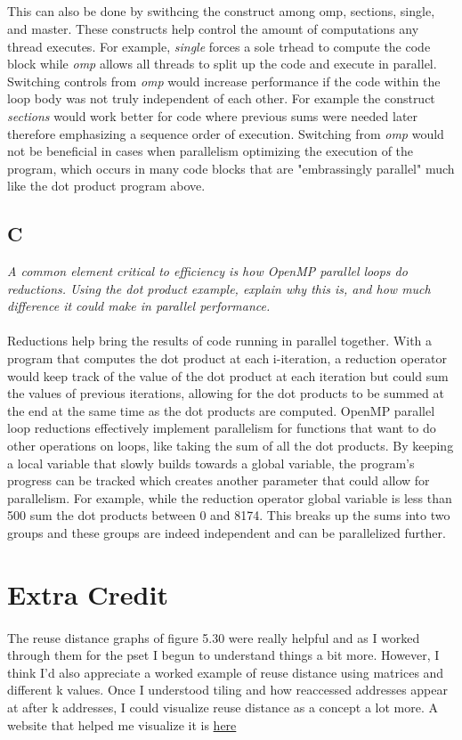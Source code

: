\documentclass[10pt]{article}
\begin{document}
\subparagraph{} This can also be done by swithcing the construct among omp, sections, single, and master. These constructs help control the amount of computations
any thread executes. For example, \textit{single} forces a sole trhead to compute the code block while \textit{omp} allows all threads to split up the code and execute 
in parallel. Switching controls from \textit{omp} would increase performance if the code within the loop body was not truly independent of each other. For example the construct \textit{sections} 
would work better for code where previous sums were needed later therefore emphasizing a sequence order of execution. Switching from \textit{omp} would not be beneficial in cases when parallelism optimizing
the execution of the program, which occurs in many code blocks that are "embrassingly parallel" much like the dot product program above.  
\subsection{C}
\textit{A common element critical to efficiency is how OpenMP parallel loops do reductions.
Using the dot product example, explain why this is, and how much difference it could
make in parallel performance.}
\paragraph{} Reductions help bring the results of code running in parallel together. With a program that computes the dot product at each i-iteration, a reduction operator would
keep track of the value of the dot product at each iteration but could sum the values of previous iterations, allowing for the dot products to be summed at the end at the same time 
as the dot products are computed. OpenMP parallel loop reductions effectively implement parallelism for functions that want to do other operations on loops, like taking the sum of 
all the dot products. By keeping a local variable that slowly builds towards a global variable, the program's progress can be tracked which creates another parameter that could allow for 
parallelism. For example, while the reduction operator global variable is less than 500 sum the dot products between 0 and 8174. This breaks up the sums into two groups and these groups 
are indeed independent and can be parallelized further.  

\section{Extra Credit}
\paragraph{} The reuse distance graphs of figure 5.30 were really helpful and as I worked through them for the pset I begun to understand things a bit more. However,
I think I'd also appreciate a worked example of reuse distance using matrices and different k values. Once I understood tiling and how reaccessed addresses appear at after 
k addresses, I could visualize reuse distance as a concept a lot more. A website that helped me visualize it is \href{https://jan.ucc.nau.edu/mg2745/pedagogic_modules/courses/hpcdataintensive/distance_matrix_2/}{here}
\end{document}
